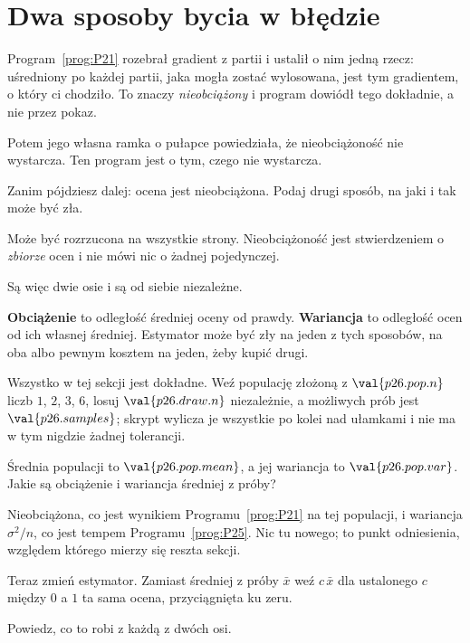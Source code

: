 \section{Dwa sposoby bycia w błędzie}
\label{sec:P26-two-ways}

\begin{fr}
Program~\ref{prog:P21} rozebrał gradient z partii i ustalił o nim jedną
rzecz: uśredniony po każdej partii, jaka mogła zostać wylosowana, jest tym
gradientem, o który ci chodziło. To znaczy \emph{nieobciążony} i program
dowiódł tego dokładnie, a nie przez pokaz.

Potem jego własna ramka o pułapce powiedziała, że nieobciążoność nie
wystarcza. Ten program jest o tym, czego nie wystarcza.

Zanim pójdziesz dalej: ocena jest nieobciążona. Podaj drugi sposób, na jaki
i tak może być zła.
\dotline
\nextframe
\end{fr}

\begin{fr}
\begin{ansblock}
Może być rozrzucona na wszystkie strony. Nieobciążoność jest stwierdzeniem o
\emph{zbiorze} ocen i nie mówi nic o żadnej pojedynczej.
\end{ansblock}

Są więc dwie osie i są od siebie niezależne.

\textbf{Obciążenie} to odległość średniej oceny od prawdy.
\textbf{Wariancja} to odległość ocen od ich własnej średniej. Estymator może
być zły na jeden z tych sposobów, na oba albo \dash{} pewnym kosztem \dash{}
na jeden, żeby kupić drugi.

Wszystko w tej sekcji jest dokładne. Weź populację złożoną z
$\val{p26.pop.n}$ liczb $1$, $2$, $3$, $6$, losuj
$\val{p26.draw.n}$ niezależnie, a możliwych prób jest $\val{p26.samples}$;
skrypt wylicza je wszystkie po kolei nad ułamkami i nie ma w tym nigdzie
żadnej tolerancji.

Średnia populacji to $\val{p26.pop.mean}$, a jej wariancja to
$\val{p26.pop.var}$. Jakie są obciążenie i wariancja średniej z próby?
\dotline
\nextframe
\end{fr}

\begin{fr}

Nieobciążona, co jest wynikiem Programu~\ref{prog:P21} na tej populacji, i
wariancja $\sigma^{2}/n$, co jest tempem Programu~\ref{prog:P25}. Nic tu
nowego; to punkt odniesienia, względem którego mierzy się reszta sekcji.

Teraz zmień estymator. Zamiast średniej z próby $\bar{x}$ weź
$c\,\bar{x}$ dla ustalonego $c$ między $0$ a $1$ \dash{} ta sama ocena,
przyciągnięta ku zeru.

Powiedz, co to robi z każdą z dwóch osi.
\dotline
\nextframe
\end{fr}

